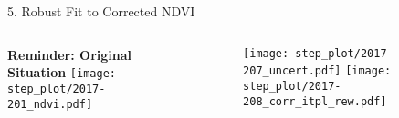 \begin{frame}[t]{5. Robust Fit to Corrected NDVI}
    \begin{columns}
        \begin{column}{0.45\textwidth}
            \textbf{Reminder: Original Situation}
            \texttt{[image: step\_plot/2017-201\_ndvi.pdf]}
        \end{column}
        \begin{column}{0.42\textwidth}
            \begin{figure}
                \vspace{-1.8cm}
                \texttt{[image: step\_plot/2017-207\_uncert.pdf]}
                \texttt{[image: step\_plot/2017-208\_corr\_itpl\_rew.pdf]}
            \end{figure}
        \end{column}
    \end{columns}
\end{frame}

